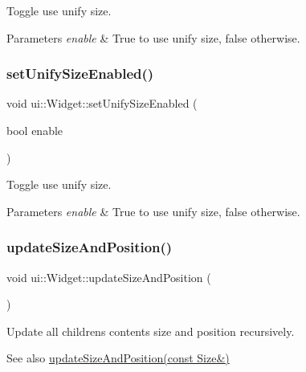 Toggle use unify size. 
\begin{DoxyParams}{Parameters}
{\em enable} & True to use unify size, false otherwise. \\
\hline
\end{DoxyParams}
\mbox{\label{classui_1_1Widget_a95c1265f951f97e9d7088f26ba745ff4}} 
\subsubsection{\texorpdfstring{set\+Unify\+Size\+Enabled()}{setUnifySizeEnabled()}\hspace{0.1cm}{\footnotesize\ttfamily [2/2]}}
{\footnotesize\ttfamily void ui\+::\+Widget\+::set\+Unify\+Size\+Enabled (\begin{DoxyParamCaption}\item[{bool}]{enable }\end{DoxyParamCaption})}

Toggle use unify size. 
\begin{DoxyParams}{Parameters}
{\em enable} & True to use unify size, false otherwise. \\
\hline
\end{DoxyParams}
\mbox{\label{classui_1_1Widget_a5c67abbcfeb1323fb80319f6db9d8e14}} 
\subsubsection{\texorpdfstring{update\+Size\+And\+Position()}{updateSizeAndPosition()}\hspace{0.1cm}{\footnotesize\ttfamily [1/4]}}
{\footnotesize\ttfamily void ui\+::\+Widget\+::update\+Size\+And\+Position (\begin{DoxyParamCaption}{ }\end{DoxyParamCaption})}

Update all children\textquotesingle{}s contents size and position recursively. \begin{DoxySeeAlso}{See also}
{\ttfamily \hyperlink{classui_1_1Widget_a77fcdcda9d9affafe2a16e369ae8fb05}{update\+Size\+And\+Position(const Size\&)}} 
\end{DoxySeeAlso}
\mbox{\label{classui_1_1Widget_a5c67abbcfeb1323fb80319f6db9d8e14}} 
